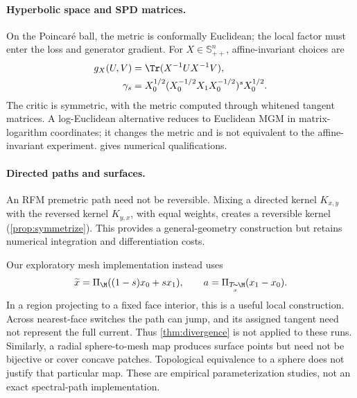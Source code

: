 \paragraph{Hyperbolic space and SPD matrices.}
On the Poincar\'e ball, the metric is conformally Euclidean; the local factor must enter the loss and generator gradient. For $X\in\mathbb S_{++}^n$, affine-invariant choices are
\begin{align}
g_X(U,V)&=\Tr(X^{-1}UX^{-1}V),\notag\\
\gamma_s&=X_0^{1/2}(X_0^{-1/2}X_1X_0^{-1/2})^sX_0^{1/2}.
\label{eq:spd}
\end{align}
The critic is symmetric, with the metric computed through whitened tangent matrices. A log-Euclidean alternative \citep{arsigny2006log} reduces to Euclidean MGM in matrix-logarithm coordinates; it changes the metric and is not equivalent to the affine-invariant experiment.  gives numerical qualifications.

\paragraph{Directed paths and surfaces.}
An RFM premetric path need not be reversible. Mixing a directed kernel $K_{x,y}$ with the reversed kernel $K_{y,x}$, with equal weights, creates a reversible kernel (\cref{prop:symmetrize}). This provides a general-geometry construction but retains numerical integration and differentiation costs.

Our exploratory mesh implementation instead uses
\begin{equation}
\widetilde x=\Pi_\M((1-s)x_0+sx_1),\qquad
a=\Pi_{T_{\widetilde x}\M}(x_1-x_0).
\label{eq:mesh-surrogate}
\end{equation}
In a region projecting to a fixed face interior, this is a useful local construction. Across nearest-face switches the path can jump, and its assigned tangent need not represent the full current. Thus \cref{thm:divergence} is not applied to these runs. Similarly, a radial sphere-to-mesh map produces surface points but need not be bijective or cover concave patches. Topological equivalence to a sphere does not justify that particular map. These are empirical parameterization studies, not an exact spectral-path implementation.
